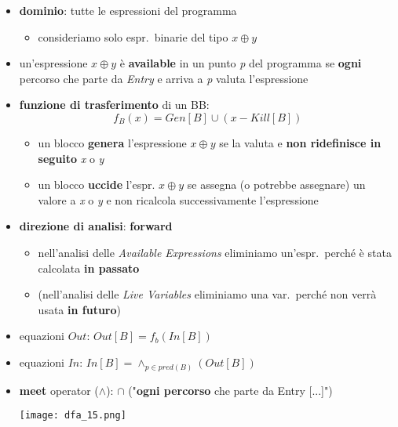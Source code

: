 \begin{itemize}
  \item \textbf{dominio}: tutte le espressioni del programma
    \begin{itemize}
      \item consideriamo solo espr.~binarie del tipo $x \oplus y$
    \end{itemize}
  \item un'espressione $x \oplus y$ \`e \textbf{available} in un punto \textit{p} del programma se \textbf{ogni} percorso che parte da \textit{Entry} e arriva a \textit{p} valuta l'espressione
  \item \textbf{funzione di trasferimento} di un BB:
    \begin{equation*}
      f_{B}(x) = Gen[B] \cup (x - Kill[B])
    \end{equation*}
    \begin{itemize}
      \item un blocco \textbf{genera} l'espressione $x \oplus y$ se la valuta e \textbf{non ridefinisce in seguito} \textit{x} o \textit{y}
      \item un blocco \textbf{uccide} l'espr. $x \oplus y$ se assegna (o potrebbe assegnare) un valore a \textit{x} o \textit{y} e non ricalcola successivamente l'espressione
    \end{itemize}
  \item \textbf{direzione di analisi}: \textbf{forward}
    \begin{itemize}
      \item nell'analisi delle \textit{Available Expressions} eliminiamo un'espr.~perch\'e \`e stata calcolata \textbf{in passato}
      \item (nell'analisi delle \textit{Live Variables} eliminiamo una var.~perch\'e non verr\`a usata \textbf{in futuro})
    \end{itemize}
  \item equazioni $Out$: $Out[B] = f_{b}(In[B])$
  \item equazioni $In$: $In[B] = \wedge _{p\in pred(B)}(Out[B])$
  \item \textbf{meet} operator ($\wedge$): $\cap$ ("\textbf{ogni percorso} che parte da Entry [...]")
    \begin{center}
      \texttt{[image: dfa\_15.png]}
    \end{center}
\end{itemize}

